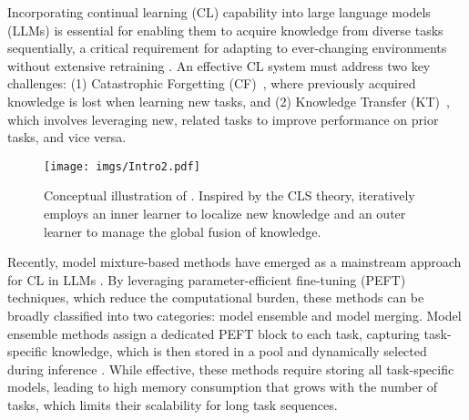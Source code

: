 Incorporating continual learning (CL) capability into large language models (LLMs) is essential for enabling them to acquire knowledge from diverse tasks sequentially, a critical requirement for adapting to ever-changing environments without extensive retraining \cite{wang2024comprehensive, jiang2024interpretable, yu2024recent, chang2024survey}.  
An effective CL system must address two key challenges: (1) Catastrophic Forgetting (CF)~\cite{mccloskey1989catastrophic}, where previously acquired knowledge is lost when learning new tasks, and (2) Knowledge Transfer (KT)~\cite{ke2021achieving}, which involves leveraging new, related tasks to improve performance on prior tasks, and vice versa.



\begin{figure}[t]
  \centering
  \texttt{[image: imgs/Intro2.pdf]}
  \caption{
  Conceptual illustration of {\ouralg}. Inspired by the CLS theory, {\ouralg} iteratively employs an inner learner to localize new knowledge and an outer learner to manage the global fusion of knowledge.
  }
  \label{fig:intro}
\end{figure}

Recently, model mixture-based methods have emerged as a mainstream approach for CL in LLMs \cite{chen2023lifelong, wu2024f, rypesc2024divide}. 
By leveraging parameter-efficient fine-tuning (PEFT) techniques, which reduce the computational burden, these methods can be broadly classified into two categories: model ensemble and model merging.
Model ensemble methods assign a dedicated PEFT block to each task, capturing task-specific knowledge, which is then stored in a pool and dynamically selected during inference \cite{zhu2024llama, wang2024rehearsal}.
While effective, these methods require storing all task-specific models, leading to high memory consumption that grows with the number of tasks, which limits their scalability for long task sequences.





